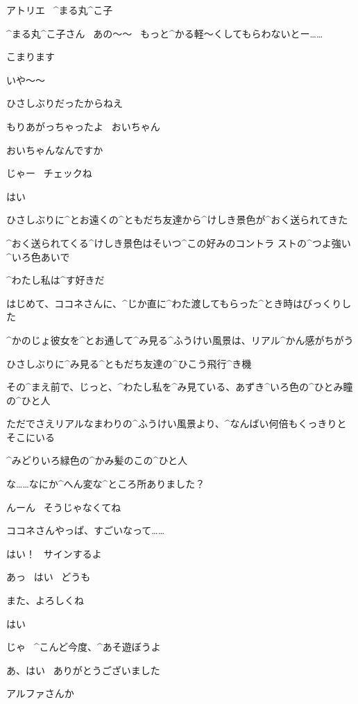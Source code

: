 \page[120]
\Sign アトリエ
\ ^{まる}{丸}^{こ}{子}

\page[123]
\Kokone ^{まる}{丸}^{こ}{子}さん
\ あの〜〜
\ もっと^{かる}{軽}〜くしてもらわないとー……

\Kokone こまります

\Maruko いや〜〜

\Maruko ひさしぶりだったからねえ

\Maruko もりあがっちゃったよ
\ おいちゃん

\Kokone おいちゃんなんですか

\page
\Maruko じゃー
\ チェックね

\Kokone はい

\Maruko ひさしぶりに^{とお}{遠}くの^{ともだち}{友達}から^{けしき}{景色}が^{おく}{送}られてきた

\Maruko ^{おく}{送}られてくる^{けしき}{景色}はそいつ^{この}{好}みのコントラ
ストの^{つよ}{強}い^{いろ}{色}あいで

\Maruko ^{わたし}{私}は^{す}{好}きだ

\Maruko はじめて、ココネさんに、^{じか}{直}に^{わた}{渡}してもらった^{とき}{時}はびっくりした

\Maruko ^{かのじょ}{彼女}を^{とお}{通}して^{み}{見}る^{ふうけい}{風景}は、リアル^{かん}{感}がちがう

\page[127]
\Maruko ひさしぶりに^{み}{見}る^{ともだち}{友達}の^{ひこう}{飛行}^{き}{機}

\Maruko その^{まえ}{前}で、じっと、^{わたし}{私}を^{み}{見}ている、あずき^{いろ}{色}の^{ひとみ}{瞳}の^{ひと}{人}

\Maruko ただでさえリアルなまわりの^{ふうけい}{風景}より、^{なんばい}{何倍}もくっきりとそこにいる

\Maruko ^{みどりいろ}{緑色}の^{かみ}{髪}のこの^{ひと}{人}

\page
\Kokone な……なにか^{へん}{変}な^{ところ}{所}ありました？

\Maruko んーん
\ そうじゃなくてね

\Maruko ココネさんやっぱ、すごいなって……

\Maruko はい！
\ サインするよ

\Kokone あっ
\ はい
\ どうも

\page
\Maruko また、よろしくね

\Kokone はい

\Maruko じゃ
\ ^{こんど}{今度}、^{あそ}{遊}ぼうよ

\Kokone あ、はい
\ ありがとうございました

\page
\Maruko アルファさんか


